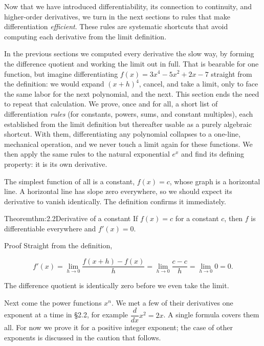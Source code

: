 \documentclass[a4paper,12pt,oneside]{memoir}
\begin{document}
Now that we have introduced differentiability, its connection to continuity, and higher-order derivatives, we turn in the next sections to rules that make differentiation \emph{efficient}. These rules are systematic shortcuts that avoid computing each derivative from the limit definition.


In the previous sections we computed every derivative the slow way, by forming the difference quotient and working the limit out in full. That is bearable for one function, but imagine differentiating \(f(x) = 3x^{4} - 5x^{2} + 2x - 7\) straight from the definition: we would expand \((x + h)^{4}\), cancel, and take a limit, only to face the same labor for the next polynomial, and the next. This section ends the need to repeat that calculation. We prove, once and for all, a short list of differentiation \emph{rules} (for constants, powers, sums, and constant multiples), each established from the limit definition but thereafter usable as a purely algebraic shortcut. With them, differentiating any polynomial collapses to a one-line, mechanical operation, and we never touch a limit again for these functions. We then apply the same rules to the natural exponential \(e^{x}\) and find its defining property: it is its own derivative.

The simplest function of all is a constant, \(f(x) = c\), whose graph is a horizontal line. A horizontal line has slope zero everywhere, so we should expect its derivative to vanish identically. The definition confirms it immediately.

\begin{envtheorem}{Theorem}{thm:2.2}{Derivative of a constant}
If \(f(x) = c\) for a constant \(c\), then \(f\) is differentiable everywhere and \(f'(x) = 0\).
\end{envtheorem}
\begin{envproof}{Proof}{}{}
Straight from the definition,

\[ f'(x) = \lim_{h \to 0} \frac{f(x + h) - f(x)}{h} = \lim_{h \to 0} \frac{c - c}{h} = \lim_{h \to 0} 0 = 0. \]

The difference quotient is identically zero before we even take the limit.
\end{envproof}
Next come the power functions \(x^{n}\). We met a few of their derivatives one exponent at a time in §2.2, for example \(\dfrac{d}{dx}x^{2} = 2x\). A single formula covers them all. For now we prove it for a positive integer exponent; the case of other exponents is discussed in the caution that follows.
\end{document}
